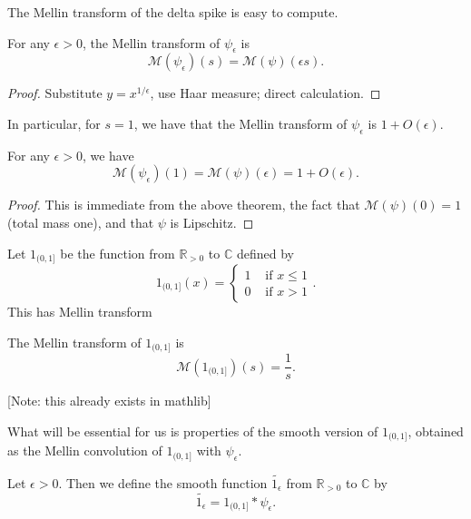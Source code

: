 The Mellin transform of the delta spike is easy to compute.
\begin{theorem}\label{MellinOfDeltaSpike}
For any $\epsilon>0$, the Mellin transform of $\psi_\epsilon$ is
$$\mathcal{M}(\psi_\epsilon)(s) = \mathcal{M}(\psi)\left(\epsilon s\right).$$
\end{theorem}



\begin{proof}
Substitute $y=x^{1/\epsilon}$, use Haar measure; direct calculation.
\end{proof}



In particular, for $s=1$, we have that the Mellin transform of $\psi_\epsilon$ is $1+O(\epsilon)$.
\begin{corollary}\label{MellinOfDeltaSpikeAt1}
For any $\epsilon>0$, we have
$$\mathcal{M}(\psi_\epsilon)(1) =
\mathcal{M}(\psi)(\epsilon)= 1+O(\epsilon).$$
\end{corollary}



\begin{proof}
This is immediate from the above theorem, the fact that $\mathcal{M}(\psi)(0)=1$ (total mass one),
and that $\psi$ is Lipschitz.
\end{proof}



Let $1_{(0,1]}$ be the function from $\mathbb{R}_{>0}$ to $\mathbb{C}$ defined by
$$1_{(0,1]}(x) = \begin{cases}
1 & \text{ if }x\leq 1\\
0 & \text{ if }x>1
\end{cases}.$$
This has Mellin transform
\begin{theorem}\label{MellinOf1}
The Mellin transform of $1_{(0,1]}$ is
$$\mathcal{M}(1_{(0,1]})(s) = \frac{1}{s}.$$
\end{theorem}
[Note: this already exists in mathlib]



What will be essential for us is properties of the smooth version of $1_{(0,1]}$, obtained as the
 Mellin convolution of $1_{(0,1]}$ with $\psi_\epsilon$.
\begin{definition}\label{Smooth1}
Let $\epsilon>0$. Then we define the smooth function $\widetilde{1_{\epsilon}}$ from $\mathbb{R}_{>0}$ to $\mathbb{C}$ by
$$\widetilde{1_{\epsilon}} = 1_{(0,1]}\ast\psi_\epsilon.$$
\end{definition}



